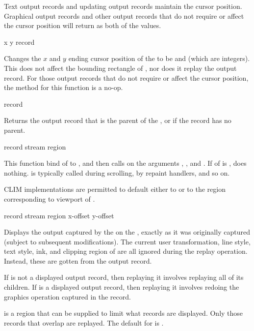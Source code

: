 Text output records and updating output records maintain the cursor position.
Graphical output records and other output records that do not require or affect
the cursor position will return  as both of the values.

 {x y record}

Changes the $x$ and $y$ ending cursor position of the 
 to be  and  (which are integers).  This does not
affect the bounding rectangle of , nor does it replay the output
record.  For those output records that do not require or affect the cursor
position, the method for this function is a no-op.


 {record}

Returns the output record that is the parent of the 
, or  if the record has no parent.


 {record stream \optional region}

This function bind  of  to , and
then calls  on the arguments ,
, and .  If  of  is
,  does nothing.   is typically called during
scrolling, by repaint handlers, and so on.

CLIM implementations are permitted to default  either to  or
to the region corresponding to viewport of .

 {record stream \optional region x-offset y-offset}

Displays the output captured by the   on the
 , exactly as it was originally
captured (subject to subsequent modifications).  The current user
transformation, line style, text style, ink, and clipping region of 
are all ignored during the replay operation.  Instead, these are gotten from the
output record.

If  is not a displayed output record, then replaying it involves
replaying all of its children.  If  is a displayed output record,
then replaying it involves redoing the graphics operation captured in the
record.

 is a region that can be supplied to limit what records are
displayed.  Only those records that overlap  are replayed.  The
default for  is .

